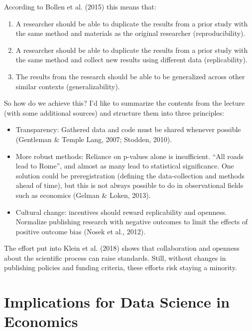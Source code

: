 \documentclass[
  a4paper,
]{article}
\providecommand{\tightlist}{%
  \setlength{\itemsep}{0pt}\setlength{\parskip}{0pt}}\usepackage{longtable,booktabs,array}
\begin{document}
According to Bollen et al. (2015) this means that:

\begin{enumerate}
\def\labelenumi{\arabic{enumi}.}
\tightlist
\item
  A researcher should be able to duplicate the results from a prior
  study with the same method and materials as the original researcher
  (reproducibility).
\item
  A researcher should be able to duplicate the results from a prior
  study with the same method and collect new results using different
  data (replicability).
\item
  The results from the research should be able to be generalized across
  other similar contexts (generalizability).
\end{enumerate}

So how do we achieve this? I'd like to summarize the contents from the
lecture (with some additional sources) and structure them into three
principles:

\begin{itemize}
\tightlist
\item
  Transparency: Gathered data and code must be shared whenever possible
  (Gentleman \& Temple Lang, 2007; Stodden, 2010).
\item
  More robust methods: Reliance on p-values alone is insufficient. ``All
  roads lead to Rome'', and almost as many lead to statistical
  significance. One solution could be preregistration (defining the
  data-collection and methods ahead of time), but this is not always
  possible to do in observational fields such as economics (Gelman \&
  Loken, 2013).
\item
  Cultural change: incentives should reward replicability and openness.
  Normalize publishing research with negative outcomes to limit the
  effects of positive outcome bias (Nosek et al., 2012).
\end{itemize}

The effort put into Klein et al. (2018) shows that collaboration and
openness about the scientific process can raise standards. Still,
without changes in publishing policies and funding criteria, these
efforts risk staying a minority.

\section{Implications for Data Science in
Economics}\label{implications-for-data-science-in-economics}
\end{document}
